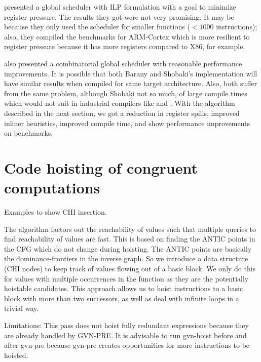 \documentclass[acmlarge,review,anonymous]{acmart}\settopmatter{printfolios=true}
\begin{document}
\citet{barany2013} presented a global scheduler with ILP formulation with
a goal to minimize register pressure. The results they got were not very
promising. It may be because they only used the scheduler for smaller functions
($<1000$ instructions); also, they compiled the benchmarks for ARM-Cortex which
is more resilient to register pressure because it has more registers compared to
X86, for example.

\citet{shobaki2013} also presented a combinatorial global scheduler with
reasonable performance improvements. It is possible that both Barany and
Shobaki's implementation will have similar results when compiled for same target
architecture. Also, both suffer from the same problem, although Shobaki not so
much, of large compile times which would not suit in industrial compilers like
\GCC{} and \LLVM{}. With the algorithm described in the next section, we got a
reduction in register spills, improved inliner heuristics, improved compile
time, and show performance improvements on \SPEC{} benchmarks.

\section{Code hoisting of congruent computations}
Examples to show CHI insertion.

The algorithm factors out the reachability of values such that multiple queries
to find reachability of values are fast. This is based on finding the ANTIC
points in the CFG which do not change during hoisting. The ANTIC points are
basically the dominance-frontiers in the inverse graph. So we introduce a data
structure (CHI nodes) to keep track of values flowing out of a basic block. We
only do this for values with multiple occurrences in the function as they are
the potentially hoistable candidates. This approach allows us to hoist
instructions to a basic block with more than two successors, as well as deal
with infinite loops in a trivial way.

Limitations: This pass does not hoist fully redundant expressions because they
are already handled by GVN-PRE. It is advisable to run gvn-hoist before and
after gvn-pre because gvn-pre creates opportunities for more instructions to be
hoisted.
\end{document}
